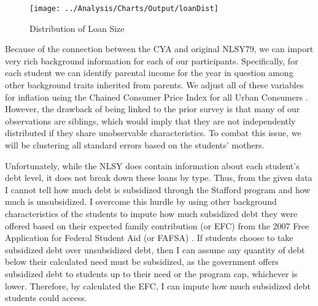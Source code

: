 \documentclass[12pt]{article}
\begin{document}
	\begin{figure}
		\centering
		\caption{Distribution of Loan Size}
		\label{loanDist}
		\texttt{[image: ../Analysis/Charts/Output/loanDist]}
	\end{figure}

	
	Because of the connection between the CYA and original NLSY79, we can import very rich background information for each of our participants. Specifically, for each student we can identify parental income for the year in question among other background traits inherited from parents. We adjust all of these variables for inflation using the Chained Consumer Price Index for all Urban Consumers \parencite{bls2019}. However, the drawback of being linked to the prior survey is that many of our observations are siblings, which would imply that they are not independently distributed if they share unobservable characteristics. To combat this issue, we will be clustering all standard errors based on the students' mothers. 
	
	Unfortunately, while the NLSY does contain information about each student's debt level, it does not break down these loans by type. Thus, from the given data I cannot tell how much debt is subsidized through the Stafford program and how much is unsubsidized. I overcome this hurdle by using other background characteristics of the students to impute how much subsidized debt they were offered based on their expected family contribution (or EFC) from the 2007 Free Application for Federal Student Aid (or FAFSA) \parencite{doe2007}. If students choose to take subsidized debt over unsubsidized debt, then I can assume any quantity of debt below their calculated need must be subsidized, as the government offers subsidized debt to students up to their need or the program cap, whichever is lower. Therefore, by calculated the EFC, I can impute how much subsidized debt students could access.
	
\end{document}
